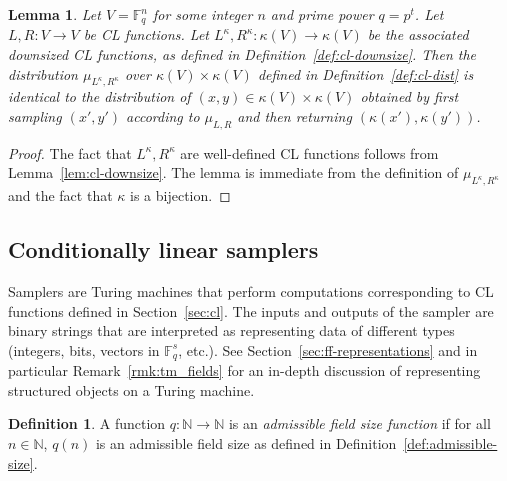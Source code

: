 \documentclass[11pt]{article}
\newtheorem{lemma}[theorem]{Lemma}
\theoremstyle{definition}
\newtheorem{definition}[theorem]{Definition}
\newcommand{\N}{\ensuremath{\mathbb{N}}}
\newcommand{\F}{\ensuremath{\mathbb{F}}}
\newcommand{\downsize}{\kappa}
\begin{document}
\begin{lemma}\label{lem:downsize-cl-dist}
  Let $V = \F_q^n$ for some integer $n$ and prime power $q=p^t$.
  Let $L,R : V\to V$ be CL functions.
  Let $L^\downsize, R^\downsize : \downsize(V)\to \downsize(V)$ be the
  associated downsized CL functions, as defined in
  Definition~\ref{def:cl-downsize}.
  Then the distribution $\mu_{L^\downsize,R^\downsize}$ over $\downsize(V)\times
  \downsize(V)$ defined in Definition~\ref{def:cl-dist} is identical to the
  distribution of $(x,y) \in \downsize(V)\times \downsize(V)$ obtained by first
  sampling $(x',y')$ according to $\mu_{L,R}$ and then returning
  $(\downsize(x'),\downsize(y'))$.
\end{lemma}

\begin{proof}
  The fact that $L^\downsize, R^\downsize$ are well-defined CL functions follows
  from Lemma~\ref{lem:cl-downsize}.
  The lemma is immediate from the definition of $\mu_{L^\downsize,R^\downsize}$
  and the fact that $\downsize$ is a bijection.
\end{proof}

\subsection{Conditionally linear samplers}
\label{sec:cls}

Samplers are Turing machines that perform computations corresponding to CL
functions defined in Section~\ref{sec:cl}.
The inputs and outputs of the sampler are binary strings that are interpreted as
representing data of different types (integers, bits, vectors in $\F_q^s$,
etc.).
See Section~\ref{sec:ff-representations} and in particular
Remark~\ref{rmk:tm_fields} for an in-depth discussion of representing structured
objects on a Turing machine.

\begin{definition}
	A function $q: \N \to \N$ is an \emph{admissible field size function} if for
  all $n \in \N$, $q(n)$ is an admissible field size as defined in
  Definition~\ref{def:admissible-size}.
\end{definition}
\end{document}
